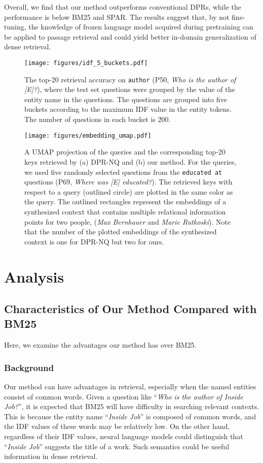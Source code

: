 \documentclass[letterpaper]{article} \usepackage{aaai23}  \usepackage{times}  \usepackage{helvet}  \usepackage{courier}  \usepackage[hyphens]{url}  \usepackage{graphicx} \urlstyle{rm} \def\UrlFont{\rm}  \usepackage{natbib}  \usepackage{caption} \frenchspacing  \setlength{\pdfpagewidth}{8.5in}  \setlength{\pdfpageheight}{11in}  \usepackage{algorithm}
\begin{document}
Overall, we find that our method outperforms conventional DPRs, while the performance is below BM25 and SPAR.
The results suggest that, by not fine-tuning, the knowledge of frozen language model acquired during pretraining can be applied to passage retrieval and could yield better in-domain generalization of dense retrieval.






\begin{figure}
	\centering
	\texttt{[image: figures/idf\_5\_buckets.pdf]}
	\caption{
		The top-20 retrieval accuracy on \texttt{\small author} (P50, \textit{Who is the author of [E]?}), where the test set questions were grouped by the  value of the entity name in the questions.
		The questions are grouped into five buckets according to the maximum IDF value in the entity tokens.
		The number of questions in each bucket is 200.
}
	\label{fig:idf}
\end{figure}


\begin{figure*}[t]
	\centering
	\texttt{[image: figures/embedding\_umap.pdf]}
	\caption{
		A UMAP projection of the queries and the corresponding top-20 keys retrieved by (a) DPR-NQ and (b) our method.
		For the queries, we used five randomly selected questions from the \texttt{\small educated at} questions (P69, \textit{Where was [E] educated?}).
		The retrieved keys with respect to a query (outlined circle) are plotted in the same color as the query.
		The outlined rectangles represent the embeddings of a synthesized context that contains multiple relational information points for two people, (\textit{Max Bernhauer} and \textit{Marie Rutkoski}).
		Note that the number of the plotted embeddings of the synthesized context is one for DPR-NQ but two for ours.
	}
	\label{fig:embedding_umap}
\end{figure*}


\section{Analysis}\label{sec:analysis}

\subsection{Characteristics of Our Method Compared with BM25}\label{sec:exp_idf}
Here, we examine the advantages our method has over BM25.
\subsubsection{Background}
Our method can have advantages in retrieval, especially when the named entities consist of common words.
Given a question like ``\textit{Who is the author of Inside Job?}'', it is expected that BM25 will have difficulty in searching relevant contexts.
This is because the entity name ``\textit{Inside Job}'' is composed of common words, and the IDF values of these words may be relatively low.
On the other hand, regardless of their IDF values, neural language models could distinguish that ``\textit{Inside Job}'' suggests the title of a work.
Such semantics could be useful information in dense retrieval.
\end{document}
